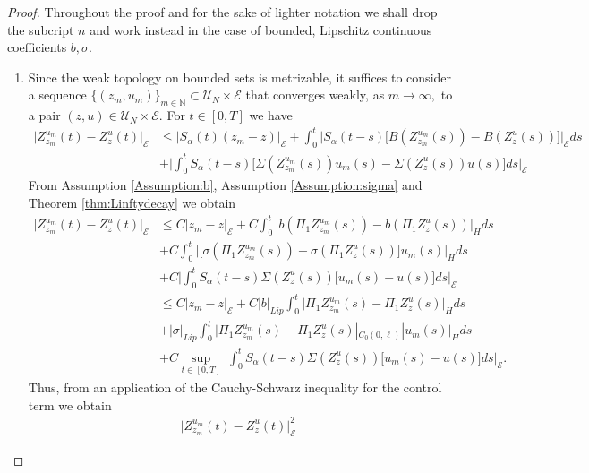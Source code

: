 \documentclass[10pt, reqno]{amsart}
\newcommand{\N}{\mathbb{N}}
\newcommand{\e}{\mathcal{E}}
\theoremstyle{definition}
\numberwithin{lem}{section}
\numberwithin{cor}{section}
\numberwithin{prop}{section}
\numberwithin{thm}{section}
\numberwithin{dfn}{section}
\begin{document}
\begin{proof}
Throughout the proof and for the sake of lighter notation we shall drop the subcript $n$ and work instead in the case of bounded, Lipschitz continuous coefficients $b,\sigma.$
\begin{enumerate}
    \item \noindent Since the weak topology on bounded sets is metrizable, it suffices to consider a sequence $\{(z_m, u_m)\}_{m\in\N}\subset\mathcal{U}_N\times\e$ that converges weakly, as $m\to\infty,$ to a pair $(z, u)\in\mathcal{U}_N\times\e.$ For $t\in[0,T]$ we have 
\begin{equation*}
\begin{aligned}
|Z^{u_m}_{z_m}(t)-Z^{u}_{z}(t)\big|_{\e}&\leq \big| S_\alpha(t)(z_m-z)\big|_{\e}+\int_{0}^{t}\bigg| S_\alpha(t-s)\big[B(Z^{u_m}_{z_m}(s))- B(Z^{u}_{z}(s))\big]\bigg|_{\e}ds\\&
+\bigg|\int_{0}^{t} S_\alpha(t-s)\big[\Sigma(Z^{u_m}_{z_m}(s))u_m(s)- \Sigma(Z^{u}_{z}(s))u(s)\big]ds\bigg|_{\e}
\end{aligned}
\end{equation*}
From Assumption \ref{Assumption:b}, Assumption \ref{Assumption:sigma} and Theorem \ref{thm:Linftydecay} we obtain 
\begin{equation*}\label{Zcontbnd1}
\begin{aligned}
|Z^{u_m}_{z_m}(t)-Z^{u}_{z}(t)\big|_{\e}&\leq C| z_m-z|_{\e}+C\int_{0}^{t} \big|b(\Pi_1Z^{u_m}_{z_m}(s))- b(\Pi_1Z^{u}_{z}(s))\big|_{H}ds\\&
+C\int_{0}^{t}\big|\big[\sigma(\Pi_1Z^{u_m}_{z_m}(s))-\sigma(\Pi_1Z^{u}_{z}(s))\big]u_m(s)\big|_{H}ds\\&+C\bigg|\int_{0}^{t}S_\alpha(t-s) \Sigma(Z^{u}_{z}(s))\big[u_m(s)-u(s)\big]ds\bigg|_{\e}\\&
\leq C| z_m-z|_{\e}+C|b|_{Lip}\int_{0}^{t}\big|\Pi_1Z^{u_m}_{z_m}(s)-\Pi_1Z^{u}_{z}(s)|_{H}ds\\&
+|\sigma|_{Lip}\int_{0}^{t}\big|\Pi_1Z^{u_m}_{z_m}(s)-\Pi_1Z^{u}_{z}(s)|_{C_0(0,\ell)}|u_m(s)|_{H}ds\\&
+C\sup_{t\in[0,T]}\bigg|\int_{0}^{t}S_\alpha(t-s) \Sigma(Z^{u}_{z}(s))\big[u_m(s)-u(s)\big]ds\bigg|_{\e}.
\end{aligned}
\end{equation*}
Thus, from an application of the Cauchy-Schwarz inequality for the control term we obtain
\begin{equation*}
\begin{aligned}
|Z^{u_m}_{z_m}(t)-Z^{u}_{z}(t)\big|^2_{\e}&

\end{aligned}
\end{equation*}
\end{enumerate}
\end{proof}
\end{document}
